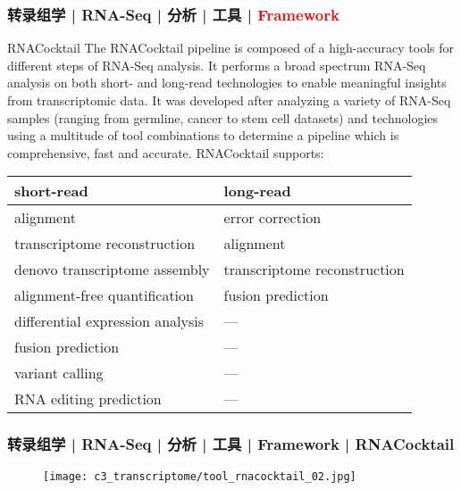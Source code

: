 \begin{frame}
  \frametitle{转录组学 | RNA-Seq | 分析 | 工具 | \textcolor{red}{Framework}}
  {\footnotesize
  \begin{block}{RNACocktail}
The RNACocktail pipeline is composed of a high-accuracy tools for different steps of RNA-Seq analysis. It performs a broad spectrum RNA-Seq analysis on both short- and long-read technologies to enable meaningful insights from transcriptomic data. It was developed after analyzing a variety of RNA-Seq samples (ranging from germline, cancer to stem cell datasets) and technologies using a multitude of tool combinations to determine a pipeline which is comprehensive, fast and accurate. RNACocktail supports:
  \end{block}
  }
  \vspace{-0.5em}
    \begin{table}
    \centering
    \begin{tabular}{ll}
      \hline
      \rowcolor{blue!50}short-read & long-read\\
      \hline
      alignment	& error correction\\
      transcriptome reconstruction & alignment\\
      denovo transcriptome assembly	& transcriptome reconstruction\\
      alignment-free quantification	& fusion prediction\\
      differential expression analysis & ---\\
      fusion prediction	& ---\\
      variant calling	& ---\\
      RNA editing prediction & ---\\
      \hline
    \end{tabular}
  \end{table}
\end{frame}


\begin{frame}
  \frametitle{转录组学 | RNA-Seq | 分析 | 工具 | Framework | RNACocktail}
  \begin{figure}
    \centering
    \texttt{[image: c3\_transcriptome/tool\_rnacocktail\_02.jpg]}
  \end{figure}
\end{frame}

